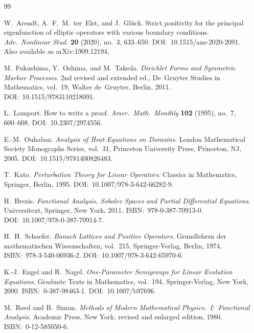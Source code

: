 \documentclass[11pt]{article}
\theoremstyle{remark}
\newcommand{\1}{\mathbf 1}
\begin{document}
\begin{thebibliography}{99}

W.~Arendt, A.~F.~M.~ter~Elst, and J.~Gl{\"u}ck.
\newblock Strict positivity for the principal eigenfunction of elliptic operators with various boundary conditions.
\newblock \emph{Adv.\ Nonlinear Stud.} \textbf{20} (2020), no.~3, 633--650.
\newblock DOI:~10.1515/ans-2020-2091.
\newblock Also available as arXiv:1909.12194.

M.~Fukushima, Y.~Oshima, and M.~Takeda.
\newblock \emph{Dirichlet Forms and Symmetric Markov Processes}.
\newblock 2nd revised and extended ed., De~Gruyter Studies in Mathematics, vol.~19,
Walter de~Gruyter, Berlin, 2011.
\newblock DOI:~10.1515/9783110218091.

L.~Lamport.
\newblock How to write a proof.
\newblock \emph{Amer.\ Math.\ Monthly} \textbf{102} (1995), no.~7, 600--608.
\newblock DOI:~10.2307/2974556.

E.-M.~Ouhabaz.
\newblock \emph{Analysis of Heat Equations on Domains}.
\newblock London Mathematical Society Monographs Series, vol.~31, Princeton University Press,
Princeton, NJ, 2005.
\newblock DOI:~10.1515/9781400826483.

T.~Kato.
\newblock \emph{Perturbation Theory for Linear Operators}.
\newblock Classics in Mathematics, Springer, Berlin, 1995.
\newblock DOI:~10.1007/978-3-642-66282-9.

H.~Brezis.
\newblock \emph{Functional Analysis, Sobolev Spaces and Partial Differential Equations}.
\newblock Universitext, Springer, New York, 2011.
\newblock ISBN:~978-0-387-70913-0.
\newblock DOI:~10.1007/978-0-387-70914-7.

H.~H.~Schaefer.
\newblock \emph{Banach Lattices and Positive Operators}.
\newblock Grundlehren der mathematischen Wissenschaften, vol.~215,
Springer-Verlag, Berlin, 1974.
\newblock ISBN:~978-3-540-06936-2.
\newblock DOI:~10.1007/978-3-642-65970-6.

K.-J.~Engel and R.~Nagel.
\newblock \emph{One-Parameter Semigroups for Linear Evolution Equations}.
\newblock Graduate Texts in Mathematics, vol.~194,
Springer-Verlag, New York, 2000.
\newblock ISBN:~0-387-98463-1.
\newblock DOI:~10.1007/b97696.

M.~Reed and B.~Simon.
\newblock \emph{Methods of Modern Mathematical Physics.\ I:\ Functional Analysis}.
\newblock Academic Press, New York, revised and enlarged edition, 1980.
\newblock ISBN:~0-12-585050-6.

\end{thebibliography}
\end{document}
